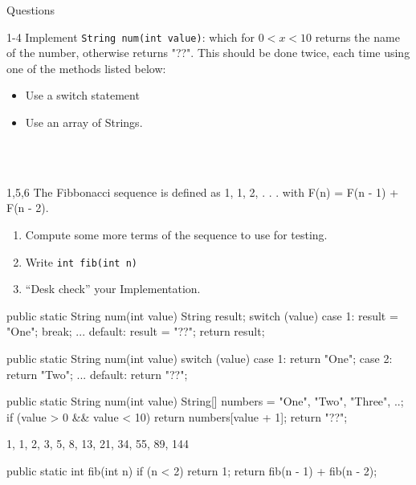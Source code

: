 \documentclass[week2]{csse2002}
\begin{document}
\begin{topic}{Questions}
\begin{subtopic}{1-4}
Implement \texttt{String num(int value)}: which for $0 < x < 10$ returns the name of the number, otherwise returns "??". This should be done twice, each time using one of the methods listed below:
\begin{itemize}
    \item Use a switch statement
    \item Use an array of Strings.
\end{itemize}
\\~\
\end{subtopic}

\begin{subtopic}{1,5,6}
The Fibbonacci sequence is defined as 1, 1, 2, . . . with F(n) = F(n - 1) + F(n - 2).
\begin{enumerate}
    \item Compute some more terms of the sequence to use for testing.
    \item Write \texttt{int fib(int n)}
    \item “Desk check” your Implementation.
\end{enumerate}
\end{subtopic}

\begin{subtopic}{2}
\begin{java}
public static String num(int value) {
    String result;
    switch (value) {
        case 1:
            result = "One";
            break;
        ...
        default:
            result = "??";
    }
    return result;
}
\end{java}
\end{subtopic}

\begin{subtopic}{3}
\begin{java}
public static String num(int value) {
    switch (value) {
        case 1:
            return "One";
        case 2:
            return "Two";
        ...
        default:
            return "??";
    }
}
\end{java}
\end{subtopic}

\begin{subtopic}{4}
\begin{java}
public static String num(int value) {
    String[] numbers = {"One", "Two", "Three", ..};
    if (value > 0 && value < 10) {
        return numbers[value + 1];
    }
    return "??";
}
\end{java}
\end{subtopic}

\begin{subtopic}{5}
1, 1, 2, 3, 5, 8, 13, 21, 34, 55, 89, 144
\end{subtopic}

\begin{subtopic}{6}
\begin{java}
public static int fib(int n) {
    if (n < 2) {
        return 1;
    }
    return fib(n - 1) + fib(n - 2);
}
\end{java}
\end{subtopic}

\end{topic}
\end{document}

